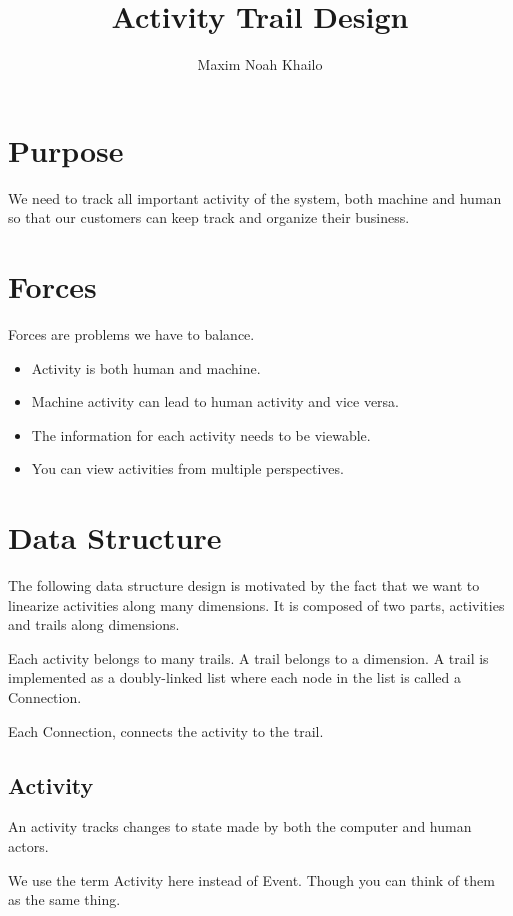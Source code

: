 \documentclass[11pt]{article}
\title{Activity Trail Design}
\author{Maxim Noah Khailo}
\begin{document}
\maketitle
\section{Purpose}

We need to track all important activity of the system, both machine and human so that
our customers can keep track and organize their business.

\section{Forces}

Forces are problems we have to balance.

\begin{itemize}
    \item Activity is both human and machine.
    \item Machine activity can lead to human activity and vice versa.
    \item The information for each activity needs to be viewable. 
    \item You can view activities from multiple perspectives.
\end{itemize}


\section{Data Structure}

The following data structure design is motivated by the fact that we want to linearize 
activities along many dimensions. It is composed of two parts, activities and trails along dimensions. 

Each activity belongs to many trails. A trail belongs to a dimension. A trail is implemented
as a doubly-linked list where each node in the list is called a Connection. 

Each Connection, connects the activity to the trail.

\newpage
\subsection{Activity}

An activity tracks changes to state made by both the computer and human actors.

We use the term Activity here instead of Event. Though you can think of them as the same 
thing. 
\end{document}
